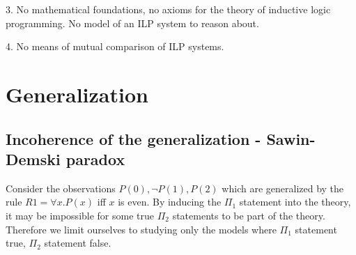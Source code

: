 3. No mathematical foundations, no axioms for the theory of inductive logic programming. No model of an ILP system to reason about.

4. No means of mutual comparison of ILP systems.
\iffalse
\section{Mathematical Foundations of ILP}
We would like to describe an ILP system with the axioms in order to study ILP systems with the mathematical rigour, to make logic statements about such systems.
I would like to have mappings (e.g. homomorphisms) between these ILP systems so that I may reason about the sub-ILP-systems. It seems Category theory to help me with the foundations. The class of the ILP systems is a category.
\subsection{An ILP system is a category}
What are objects and arrows?
\subsection{Category of ILP systems}

\subsection{Properties of ILP systems}

\subsection{}
\subsection{}
\section{Completeness of ILP systems}
Often ILP systems are complete as a result of using a strong bias rather than a sophisticated induction system.
\fi
\section{Generalization}
\subsection{Incoherence of the generalization - Sawin-Demski paradox}
Consider the observations $P(0), \neg P(1), P(2)$ which are generalized by the rule $R1=\forall x. P(x)$ iff $x$ is even.
By inducing the $\Pi_1$ statement into the theory, it may be impossible for some true $\Pi_2$ statements to be part of the theory\cite{sawin2013}.
Therefore we limit ourselves to studying only the models where $\Pi_1$ statement true, $\Pi_2$ statement false.
\iffalse
